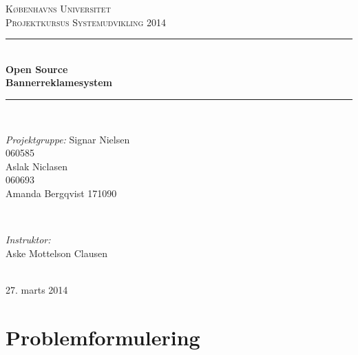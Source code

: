 \documentclass[a4paper,12pt]{article}
\begin{document}
\begin{titlepage}


\newcommand{\HRule}{\rule{\linewidth}{0.5mm}} %

\center %

\textsc{\LARGE Københavns Universitet}\\[1.5cm] %
\textsc{\Large Projektkursus Systemudvikling 2014}\\[0.5cm] %

\HRule \\[0.4cm]
{  \bfseries \large Open Source \\ \huge Bannerreklamesystem}\\[0.4cm] %
\HRule \\[1.5cm]

\begin{minipage}[t]{0.4\textwidth}
\begin{flushleft} \large
\emph{Projektgruppe:}
\newline
Signar Nielsen
\\
060585
\newline
\\
Aslak Niclasen
\\
060693
\newline
\\
Amanda Bergqvist 171090
\end{flushleft}
\end{minipage}
~
\begin{minipage}[t]{0.4\textwidth}
\begin{flushright} \large
\emph{Instruktor:} \\
Aske Mottelson Clausen %
\end{flushright}
\end{minipage}\\[4cm]

\large{27. marts 2014}

\end{titlepage}

\tableofcontents %


\clearpage %

\section{Problemformulering}
\end{document}
